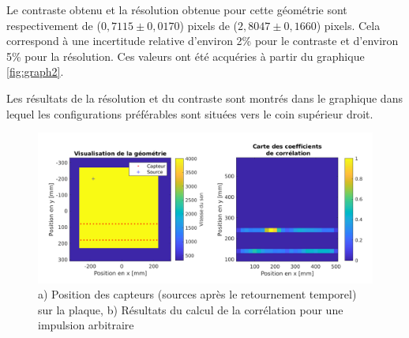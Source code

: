 \documentclass[conference]{IEEEtran}
\begin{document}

Le contraste obtenu et la résolution obtenue pour cette géométrie sont
respectivement de ($0,7115 \pm 0,0170$) pixels de ($2,8047 \pm 0,1660$) pixels. Cela correspond à une 
incertitude relative d'environ 2\% pour le contraste et d'environ 5\% pour la résolution. Ces valeurs ont 
été acquéries à partir du graphique \ref{fig:graph2}.



Les résultats de la résolution et du contraste sont montrés dans le graphique 
\cite{fig:rés-con} dans lequel les configurations préférables sont situées vers le 
coin supérieur droit. 

\begin{figure}[H]
  \centering
  \includegraphics[scale=0.25]{resultats1.png}
  \caption{a) Position des capteurs (sources après le retournement temporel)
  sur la plaque,  b) Résultats du calcul de la corrélation pour une impulsion arbitraire}
  \label{fig:graph1}
\end{figure}
\end{document}
